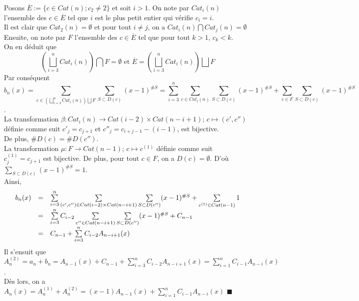 Posons $\overline{E}:=\{c\in Cat(n); c_{2}\neq 2\}$ et soit $i>1$. On note par $Cat_{i}(n)$ l'ensemble des $c\in \overline{E}$ tel que $i$ est le plus petit entier
qui vérifie $c_{i}=i$.\\
Il est clair que $Cat_{2}(n)=\emptyset$ et pour tout $i \neq j$, on a $Cat_{i}(n)\bigcap Cat_{j}(n)=\emptyset$\\
Ensuite, on note par $F$ l'ensemble des $c\in \overline{E}$ tel que pour tout $k>1$,
$c_{k}<k$.\\
On en déduit que \[
	\left(\bigsqcup\limits_{i=3}^{n}Cat_{i}(n)\right)\bigcap F=\emptyset \text{ et } \overline{E}=\left(\bigsqcup\limits_{i=3}^{n}Cat_{i}(n)\right)\bigsqcup F
\]
Par conséquent $$b_{n}(x)=  \sum\limits_{c\in \left(\bigsqcup\limits_{i=3}^{n}Cat_{i}(n)\right)\bigsqcup F} \sum\limits_{S\subset D(c)}(x-1)^{\#S}=\sum\limits_{i=3}^{n}\sum\limits_{c\in Cat_{i}(n)} \sum\limits_{S\subset D(c)}(x-1)^{\#S} + \sum\limits_{c\in F} \sum\limits_{S\subset D(c)}(x-1)^{\#S}$$. \\
La transformation $\beta: Cat_{i}(n) \longrightarrow Cat(i-2)\times Cat(n-i+1)$; $c \longmapsto (c', c'')$ définie comme suit $c'_{j}=c_{j+1}$ et $c''_{j}=c_{i+j-1}-(i-1)$, est bijective.\\
De plus, $\#D(c) = \#D(c'')$. \vspace{5pt}\\
La transformation $\mu: F \longrightarrow Cat(n-1)$; $c \longmapsto c^{(1)}$ définie comme suit $c^{(1)}_{j}=c_{j+1}$ est bijective. De plus, pour tout $c \in F$, on a $D(c)=\emptyset$. D'où $\sum\limits_{S\subset D(c)}(x-1)^{\#S}=1$.\vspace{10pt}\\
Ainsi,
$$
	\begin{array}{l l l}
		b_{n}(x) & = & \sum\limits_{i=3}^{n} \sum\limits_{(c', c'')\in Cat(i-2)\times Cat(n-i+1)} \sum\limits_{S\subset D(c'')}(x-1)^{\#S} + \sum\limits_{c^{(1)}\in Cat(n-1)}1 \\
		         & = & \sum\limits_{i=3}^{n} C_{i-2}\sum\limits_{c'' \in Cat(n-i+1)}\sum\limits_{S\subset D(c'')}(x-1)^{\#S} + C_{n-1}                                          \\
		         & = & C_{n-1} + \sum\limits_{i=3}^{n} C_{i-2}A_{n-i+1}(x)
	\end{array}
$$
Il s'ensuit que $A_{n}^{(2)}=a_{n}+b_{n}= A_{n-1}(x) + C_{n-1} + \sum\limits_{i=3}^{n} C_{i-2}A_{n-i+1}(x) = \sum\limits_{i=1}^{n}C_{i-1}A_{n-i}(x)$.\\
Dès lors, on a $A_{n}(x)= A_{n}^{(1)} + A_{n}^{(2)} = (x-1)A_{n-1}(x) + \sum\limits_{i=1}^{n}C_{i-1}A_{n-i}(x)$ \hspace{5pt}$\blacksquare$

